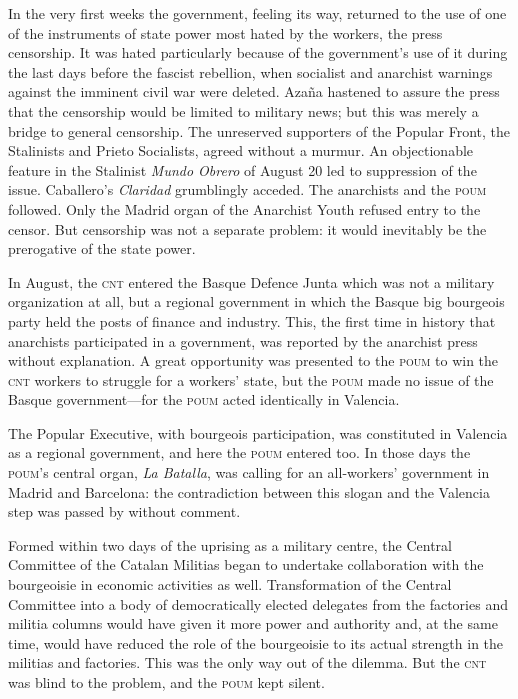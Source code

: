In the very first weeks the government, feeling its way, returned to the use of one of the instruments of state power most hated by the workers, the press censorship. It was hated particularly because of the government’s use of it during the last days before the fascist rebellion, when socialist and anarchist warnings against the imminent civil war were deleted. Azaña hastened to assure the press that the censorship would be limited to military news; but this was merely a bridge to general censorship. The unreserved supporters of the Popular Front, the Stalinists and Prieto Socialists, agreed without a murmur. An objectionable feature in the Stalinist \emph{Mundo Obrero} of August 20 led to suppression of the issue. Caballero’s \emph{Claridad} grumblingly acceded. The anarchists and the \textsc{poum} followed. Only the Madrid organ of the Anarchist Youth refused entry to the censor. But censorship was not a separate problem: it would inevitably be the prerogative of the state power.

In August, the \textsc{cnt} entered the Basque Defence Junta which was not a military organization at all, but a regional government in which the Basque big bourgeois party held the posts of finance and industry. This, the first time in history that anarchists participated in a government, was reported by the anarchist press without explanation. A great opportunity was presented to the \textsc{poum} to win the \textsc{cnt} workers to struggle for a workers’ state, but the \textsc{poum} made no issue of the Basque government---for the \textsc{poum} acted identically in Valencia.

The Popular Executive, with bourgeois participation, was constituted in Valencia as a regional government, and here the \textsc{poum} entered too. In those days the \textsc{poum}’s central organ, \emph{La Batalla}, was calling for an all-workers’ government in Madrid and Barcelona: the contradiction between this slogan and the Valencia step was passed by without comment.

Formed within two days of the uprising as a military centre, the Central Committee of the Catalan Militias began to undertake collaboration with the bourgeoisie in economic activities as well. Transformation of the Central Committee into a body of democratically elected delegates from the factories and militia columns would have given it more power and authority and, at the same time, would have reduced the role of the bourgeoisie to its actual strength in the militias and factories. This was the only way out of the dilemma. But the \textsc{cnt} was blind to the problem, and the \textsc{poum} kept silent.

